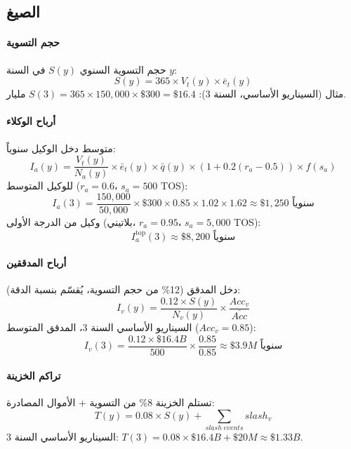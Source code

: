 \documentclass[11pt]{article}
\begin{document}
\subsection{الصيغ}
\paragraph{حجم التسوية} حجم التسوية السنوي $S(y)$ في السنة $y$:
\begin{equation}
S(y) = 365 \times V_t(y) \times \bar{e}_t(y)
\end{equation}
مثال (السيناريو الأساسي، السنة 3): $S(3) = 365 \times 150{,}000 \times \$300 = \$16.4$ مليار.

\paragraph{أرباح الوكلاء} متوسط دخل الوكيل سنوياً:
\begin{equation}
I_a(y) = \frac{V_t(y)}{N_a(y)} \times \bar{e}_t(y) \times \bar{q}(y) \times (1 + 0.2(r_a - 0.5)) \times f(s_a)
\end{equation}
للوكيل المتوسط ($r_a = 0.6$، $s_a = 500$ TOS):
\begin{equation}
I_a(3) = \frac{150{,}000}{50{,}000} \times \$300 \times 0.85 \times 1.02 \times 1.62 \approx \$1{,}250 \text{ سنوياً}
\end{equation}
وكيل من الدرجة الأولى (بلاتيني، $r_a = 0.95$، $s_a = 5{,}000$ TOS):
\begin{equation}
I_a^{\text{top}}(3) \approx \$8{,}200 \text{ سنوياً}
\end{equation}

\paragraph{أرباح المدققين} دخل المدقق (12\% من حجم التسوية، يُقسّم بنسبة الدقة):
\begin{equation}
I_v(y) = \frac{0.12 \times S(y)}{N_v(y)} \times \frac{Acc_v}{\bar{Acc}}
\end{equation}
السيناريو الأساسي السنة 3، المدقق المتوسط ($Acc_v = 0.85$):
\begin{equation}
I_v(3) = \frac{0.12 \times \$16.4B}{500} \times \frac{0.85}{0.85} \approx \$3.9M \text{ سنوياً}
\end{equation}

\paragraph{تراكم الخزينة} تستلم الخزينة 8\% من التسوية + الأموال المصادرة:
\begin{equation}
T(y) = 0.08 \times S(y) + \sum_{slash \; events} slash_v
\end{equation}
السيناريو الأساسي السنة 3: $T(3) = 0.08 \times \$16.4B + \$20M \approx \$1.33B$.
\end{document}
